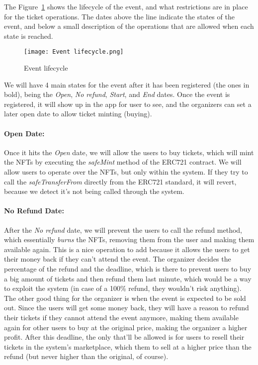 The Figure~\ref{fig:event_lifecycle} shows the lifecycle of the event, and what
restrictions are in place for the ticket operations. The dates above the line
indicate the states of the event, and below a small description of the
operations that are allowed when each state is reached.

\begin{figure}[H]
	\texttt{[image: Event lifecycle.png]}
	\centering
	\caption{Event lifecycle}\label{fig:event_lifecycle}
\end{figure}

We will have 4 main states for the event after it has been registered (the ones
in bold), being the \textit{Open}, \textit{No refund}, \textit{Start}, and
\textit{End} dates. Once the event is registered, it will show up in the app
for user to see, and the organizers can set a later open date to allow ticket
minting (buying).

\paragraph{Open Date:} Once it hits the \textit{Open} date, we will allow the users to buy tickets,
which will mint the NFTs by executing the \textit{safeMint} method of the
ERC721 contract. We will allow users to operate over the NFTs, but only within
the system. If they try to call the \textit{safeTransferFrom} directly from the
ERC721 standard, it will revert, because we detect it's not being called
through the system.

\paragraph{No Refund Date:} After the \textit{No refund} date, we will prevent the users to call the refund
method, which essentially \textit{burns} the NFTs, removing them from the user
and making them available again. This is a nice operation to add because it
allows the users to get their money back if they can't attend the event. The
organizer decides the percentage of the refund and the deadline, which is there
to prevent users to buy a big amount of tickets and then refund them last
minute, which would be a way to exploit the system (in case of a 100\% refund,
they wouldn't risk anything). The other good thing for the organizer is when
the event is expected to be sold out. Since the users will get some money back,
they will have a reason to refund their tickets if they cannot attend the event
anymore, making them available again for other users to buy at the original
price, making the organizer a higher profit. After this deadline, the only
that'll be allowed is for users to resell their tickets in the system's
marketplace, which them to sell at a higher price than the refund (but never
higher than the original, of course).


